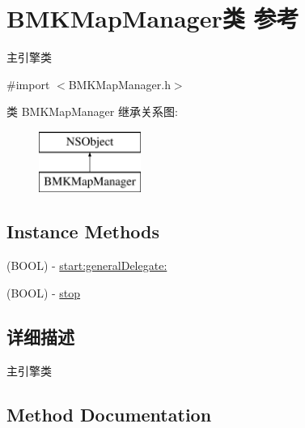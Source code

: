 \hypertarget{interface_b_m_k_map_manager}{}\section{B\+M\+K\+Map\+Manager类 参考}
\label{interface_b_m_k_map_manager}


主引擎类  




{\ttfamily \#import $<$B\+M\+K\+Map\+Manager.\+h$>$}

类 B\+M\+K\+Map\+Manager 继承关系图\+:\begin{figure}[H]
\begin{center}
\leavevmode
\includegraphics[height=2.000000cm]{interface_b_m_k_map_manager}
\end{center}
\end{figure}
\subsection*{Instance Methods}
\begin{DoxyCompactItemize}
\item 
(B\+O\+O\+L) -\/ \hyperlink{interface_b_m_k_map_manager_a95edf9c8fea4c61a79098641c4e9a50f}{start\+:general\+Delegate\+:}
\item 
(B\+O\+O\+L) -\/ \hyperlink{interface_b_m_k_map_manager_ac53850202f5017ff35c8933c171be0f1}{stop}
\end{DoxyCompactItemize}


\subsection{详细描述}
主引擎类 

\subsection{Method Documentation}
\hypertarget{interface_b_m_k_map_manager_a95edf9c8fea4c61a79098641c4e9a50f}{}
